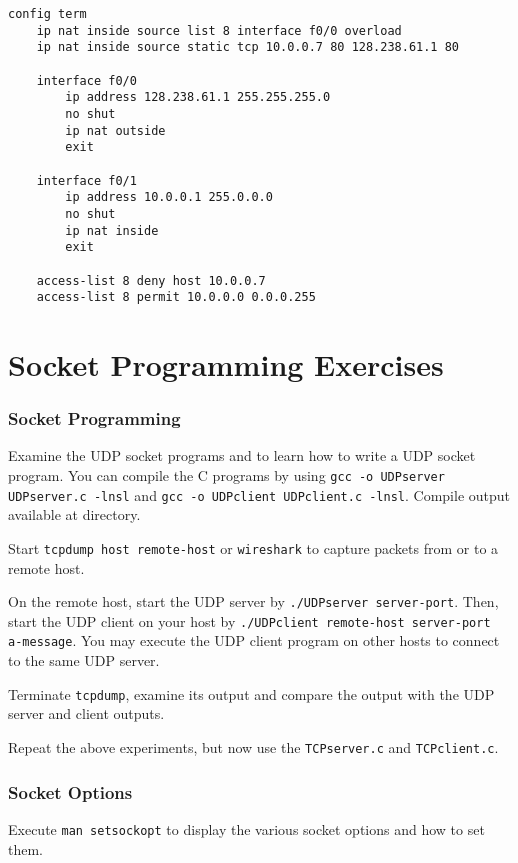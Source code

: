 \documentclass{../UTNetLab}
\begin{document}
    \begin{lstlisting}[language={cisco}, caption={PAT Router Configuration in \hyperref[fig:8.7]{Figure~8.7} (Table~8.6)\label{tab:8.6}}]
config term
    ip nat inside source list 8 interface f0/0 overload
    ip nat inside source static tcp 10.0.0.7 80 128.238.61.1 80

    interface f0/0
        ip address 128.238.61.1 255.255.255.0
        no shut
        ip nat outside
        exit

    interface f0/1
        ip address 10.0.0.1 255.0.0.0
        no shut
        ip nat inside
        exit

    access-list 8 deny host 10.0.0.7
    access-list 8 permit 10.0.0.0 0.0.0.255
    \end{lstlisting}

\part{Socket Programming Exercises}
\section{Socket Programming}
    Examine the UDP socket programs  and  to learn how to write a UDP socket program.
    You can compile the C programs by using \lstinline{gcc -o UDPserver UDPserver.c -lnsl} and \lstinline{gcc -o UDPclient UDPclient.c -lnsl}.
    Compile output available at  directory.

    Start \lstinline[emph={your-host, remote-host}]{tcpdump host remote-host} or \lstinline{wireshark} to capture packets from or to a remote host.

    On the remote host, start the UDP server by \lstinline[emph={server-port}]{./UDPserver server-port}.
    Then, start the UDP client on your host by \lstinline[emph={your-host, remote-host, server-port, a-message}]{./UDPclient remote-host server-port a-message}.
    You may execute the UDP client program on other hosts to connect to the same UDP server.

    Terminate \lstinline{tcpdump}, examine its output and compare the output with the UDP server and client outputs.

    Repeat the above experiments, but now use the \lstinline{TCPserver.c} and \lstinline{TCPclient.c}.

\section{Socket Options}
    Execute \lstinline{man setsockopt} to display the various socket options and how to set them.
\end{document}
